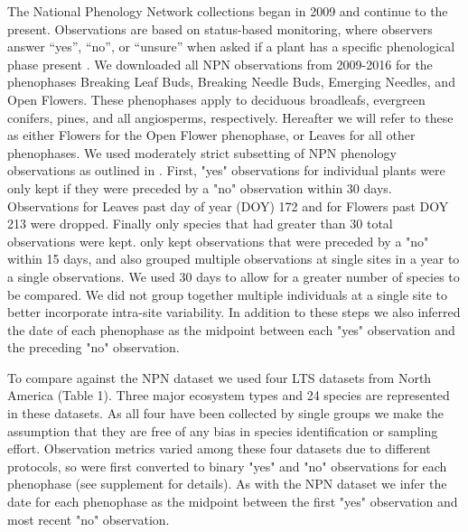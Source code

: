 \documentclass[fleqn,10pt,lineno]{wlpeerj} %
\begin{document}
The National Phenology Network collections began in 2009 and continue to the present. Observations are based on status-based monitoring, where observers answer “yes”, “no”, or “unsure” when asked if a plant has a specific phenological phase present \citep{denny2014}. We downloaded all NPN observations from 2009-2016 for the phenophases Breaking Leaf Buds, Breaking Needle Buds, Emerging Needles, and Open Flowers. These phenophases apply to deciduous broadleafs, evergreen conifers, pines, and all angiosperms, respectively. Hereafter we will refer to these as either Flowers for the Open Flower phenophase, or Leaves for all other phenophases. We used moderately strict subsetting of NPN phenology observations as outlined in \cite{crimmins2017}. First, "yes" observations for individual plants were only kept if they were preceded by a "no" observation within 30 days. Observations for Leaves past day of year (DOY) 172 and for Flowers past DOY 213 were dropped. Finally only species that had greater than 30 total observations were kept. \cite{crimmins2017} only kept observations that were preceded by a "no" within 15 days, and also grouped multiple observations at single sites in a year to a single observations. We used 30 days to allow for a greater number of species to be compared. We did not group together multiple individuals at a single site to better incorporate intra-site variability. In addition to these steps we also inferred the date of each phenophase as the midpoint between each "yes" observation and the preceding "no" observation. 

To compare against the NPN dataset we used four LTS datasets from North America (Table 1). Three major ecosystem types and 24 species are represented in these datasets. As all four have been collected by single groups we make the assumption that they are free of any bias in species identification or sampling effort. Observation metrics varied among these four datasets due to different protocols, so were first converted to binary "yes" and "no" observations for each phenophase (see supplement for details). As with the NPN dataset we infer the date for each phenophase as the midpoint between the first "yes" observation and most recent "no" observation. 
\end{document}
